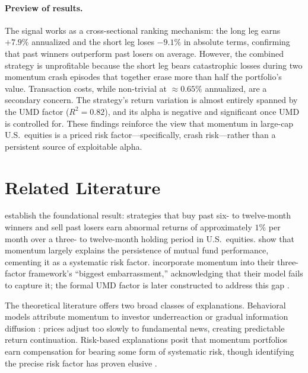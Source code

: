 \documentclass[11pt]{article}
\begin{document}
\paragraph{Preview of results.}
The signal works as a cross-sectional ranking mechanism: the long leg earns $+7.9\%$
annualized and the short leg loses $-9.1\%$ in absolute terms, confirming that past
winners outperform past losers on average. However, the combined strategy is unprofitable
because the short leg bears catastrophic losses during two momentum crash episodes that
together erase more than half the portfolio's value. Transaction costs, while non-trivial
at $\approx0.65\%$ annualized, are a secondary concern. The strategy's return variation
is almost entirely spanned by the UMD factor ($R^2 = 0.82$), and its alpha is negative
and significant once UMD is controlled for. These findings reinforce the view that
momentum in large-cap U.S.\ equities is a priced risk factor---specifically, crash
risk---rather than a persistent source of exploitable alpha.

\section{Related Literature}
\label{sec:lit}

\citet{Jegadeesh1993} establish the foundational result: strategies that buy past
six- to twelve-month winners and sell past losers earn abnormal returns of approximately
$1\%$ per month over a three- to twelve-month holding period in U.S.\ equities.
\citet{carhart1997persistence} show that momentum largely explains the persistence of
mutual fund performance, cementing it as a systematic risk factor. \citet{Fama1996}
incorporate momentum into their three-factor framework's ``biggest embarrassment,''
acknowledging that their model fails to capture it; the formal UMD factor is later
constructed to address this gap \citep{FamaFrench2015}.

The theoretical literature offers two broad classes of explanations. Behavioral models
attribute momentum to investor underreaction \citep{Barberis1998} or gradual information
diffusion \citep{Hong1999}: prices adjust too slowly to fundamental news, creating
predictable return continuation. Risk-based explanations posit that momentum portfolios
earn compensation for bearing some form of systematic risk, though identifying the precise
risk factor has proven elusive \citep{Liu2002,Johnson2002}.
\end{document}
